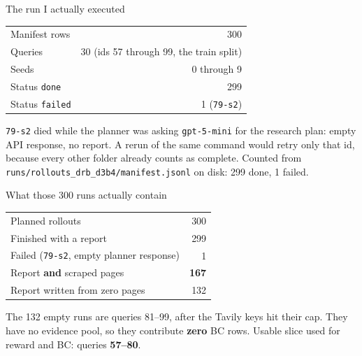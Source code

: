 \documentclass[aspectratio=169,11pt]{beamer}
\begin{document}
\begin{frame}{The run I actually executed}
  \begin{tabular}{lr}
    \hline
    Manifest rows & 300 \\
    Queries & 30 (ids 57 through 99, the train split) \\
    Seeds & 0 through 9 \\
    Status \texttt{done} & 299 \\
    Status \texttt{failed} & 1 (\texttt{79-s2}) \\
    \hline
  \end{tabular}
  \vspace{0.45em}
  \texttt{79-s2} died while the planner was asking \texttt{gpt-5-mini} for the research plan: empty API response, no report. A rerun of the same command would retry only that id, because every other folder already counts as complete.
  \vspace{0.35em}
  {\small Counted from \texttt{runs/rollouts\_drb\_d3b4/manifest.jsonl} on disk: 299 done, 1 failed.}
\end{frame}

\begin{frame}{What those 300 runs actually contain}
  \begin{tabular}{lr}
    \hline
    Planned rollouts & 300 \\
    Finished with a report & 299 \\
    Failed (\texttt{79-s2}, empty planner response) & 1 \\
    Report \textbf{and} scraped pages & \textbf{167} \\
    Report written from zero pages & 132 \\
    \hline
  \end{tabular}
  \vspace{0.5em}
  The 132 empty runs are queries 81--99, after the Tavily keys hit their cap.
  They have no evidence pool, so they contribute \textbf{zero} BC rows.
  \vspace{0.4em}
  Usable slice used for reward and BC: queries \textbf{57--80}.
\end{frame}
\end{document}
